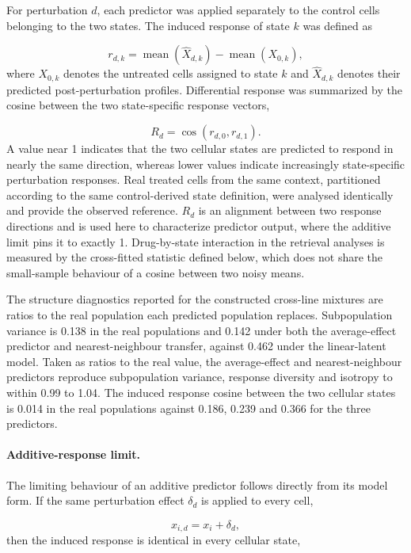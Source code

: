 \documentclass[11pt,letterpaper]{article}
\begin{document}
For perturbation $d$, each predictor was applied separately to the control cells belonging to the
two states. The induced response of state $k$ was defined as

\[
r_{d,k}
=
\operatorname{mean}
\left(
\widehat{X}_{d,k}
\right)
-
\operatorname{mean}
\left(
X_{0,k}
\right),
\]
where $X_{0,k}$ denotes the untreated cells assigned to state $k$ and
$\widehat{X}_{d,k}$ denotes their predicted post-perturbation profiles. Differential response was
summarized by the cosine between the two state-specific response vectors,

\[
R_d
=
\cos
\left(
r_{d,0},
r_{d,1}
\right).
\]
A value near 1 indicates that the two cellular states are predicted to respond in nearly the same
direction, whereas lower values indicate increasingly state-specific perturbation responses. Real
treated cells from the same context, partitioned according to the same control-derived state
definition, were analysed identically and provide the observed reference. $R_d$ is an alignment
between two response directions and is used here to characterize predictor output, where the
additive limit pins it to exactly 1. Drug-by-state interaction in the retrieval analyses is measured
by the cross-fitted statistic defined below, which does not share the small-sample behaviour of a
cosine between two noisy means.

The structure diagnostics reported for the constructed cross-line mixtures are ratios to the
real population each predicted population replaces. Subpopulation variance is 0.138 in the real
populations and 0.142 under both the average-effect predictor and nearest-neighbour transfer,
against 0.462 under the linear-latent model. Taken as ratios to the real value, the average-effect
and nearest-neighbour predictors reproduce subpopulation variance, response diversity and isotropy
to within 0.99 to 1.04. The induced response cosine between the two cellular states is 0.014 in
the real populations against 0.186, 0.239 and 0.366 for the three predictors.

\paragraph{Additive-response limit.}
The limiting behaviour of an additive predictor follows directly from its model form. If the same
perturbation effect $\delta_d$ is applied to every cell,

\[
\widehat{x}_{i,d}
=
x_i+\delta_d,
\]
then the induced response is identical in every cellular state,
\end{document}
